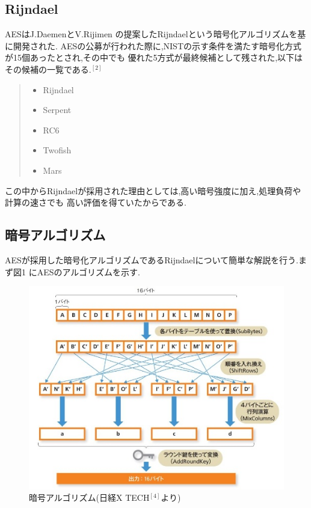 \documentclass[dvipdfmx,autodetect-engine,titlepage]{jsarticle}
\begin{document}
\subsection{Rijndael}

AESはJ.DaemenとV.Rijimen の提案したRijndaelという暗号化アルゴリズムを基に開発された.
AESの公募が行われた際に,NISTの示す条件を満たす暗号化方式が15個あったとされ,その中でも
優れた5方式が最終候補として残された,以下はその候補の一覧である.\begin{math}^{[2]}\end{math}

\begin{quote}
  \begin{itemize}
   \item Rijndael
   \item Serpent
   \item RC6
   \item Twofish
   \item Mars
  \end{itemize}
 \end{quote}

 この中からRijndaelが採用された理由としては,高い暗号強度に加え,処理負荷や計算の速さでも
 高い評価を得ていたからである.

 \subsection{暗号アルゴリズム}

 AESが採用した暗号化アルゴリズムであるRijndaelについて簡単な解説を行う.まず図1
 にAESのアルゴリズムを示す.

\begin{figure}[h]
  \centering
  \includegraphics[scale=0.4]{fig1.jpg}
  \caption{暗号アルゴリズム(日経X TECH\begin{math}^{[4]}\end{math}より)}
\end{figure}
\end{document}
